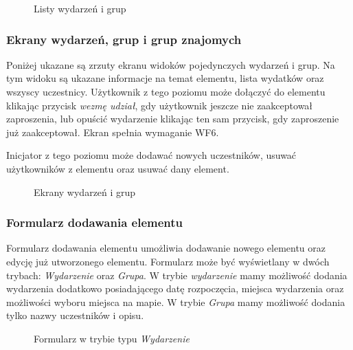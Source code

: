 \begin{figure}[h!]%
    \centering
    \qquad
    \caption{Listy wydarzeń i grup}%
\end{figure}

\clearpage
\subsubsection{Ekrany wydarzeń, grup i grup znajomych}
Poniżej ukazane są zrzuty ekranu widoków pojedynczych wydarzeń i grup. Na tym widoku są ukazane informacje na temat elementu, lista wydatków oraz wszyscy uczestnicy. Użytkownik z tego poziomu może dołączyć do elementu klikając przycisk \emph{wezmę udział}, gdy użytkownik jeszcze nie zaakceptował zaproszenia, lub opuścić wydarzenie klikając ten sam przycisk, gdy zaproszenie już zaakceptował. Ekran spełnia wymaganie WF6.

Inicjator z tego poziomu może dodawać nowych uczestników, usuwać użytkowników z elementu oraz usuwać dany element.

\begin{figure}[h!]%
    \centering
    \qquad
    \caption{Ekrany wydarzeń i grup}%
\end{figure}

\clearpage
\subsubsection{Formularz dodawania elementu}
Formularz dodawania elementu umożliwia dodawanie nowego elementu oraz edycję już utworzonego elementu. Formularz może być wyświetlany w dwóch trybach: \emph{Wydarzenie} oraz \emph{Grupa}. W trybie \emph{wydarzenie} mamy możliwość dodania wydarzenia dodatkowo posiadającego datę rozpoczęcia, miejsca wydarzenia oraz możliwości wyboru miejsca na mapie. W trybie \emph{Grupa} mamy możliwość dodania tylko nazwy uczestników i opisu.

\begin{figure}[h!]%
    \centering
    \qquad
    \caption{Formularz w trybie typu \emph{Wydarzenie}}%
\end{figure}

